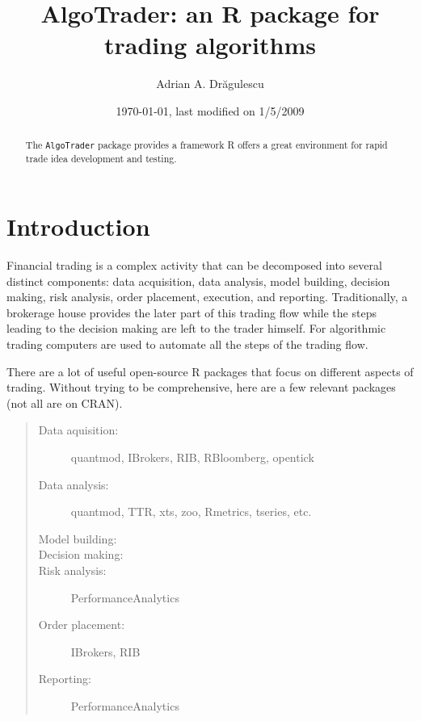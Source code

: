 \documentclass[nofootinbib]{revtex4}
\newcommand{\R}{{\normalfont\textsf{R }}{}}
\newcommand{\code}[1]{{\texttt{#1}}}
\begin{document}
\title{AlgoTrader: an R package for trading algorithms}
\author{Adrian A. Dr\u{a}gulescu}
\date{\today, last modified on 1/5/2009}

\begin{abstract}
The \code{AlgoTrader} package provides a framework \R
offers a great environment for rapid trade
idea development and testing. 
\end{abstract}

\maketitle
\tableofcontents


\section{Introduction}

Financial trading is a complex activity that can be decomposed into
several distinct components: data acquisition, data analysis, model
building, decision making, risk analysis, order placement, execution,
and reporting.  Traditionally, a brokerage house provides the later
part of this trading flow while the steps leading to the decision
making are left to the trader himself.  For algorithmic trading 
computers are used to automate all the steps of the trading flow.

There are a lot of useful open-source \R packages that focus on
different aspects of trading.  Without trying to be comprehensive,
here are a few relevant packages (not all are on CRAN).
\begin{quote}
\begin{description}
\item[Data aquisition:]quantmod, IBrokers, RIB, RBloomberg, opentick
\item[Data analysis:]quantmod, TTR, xts, zoo, Rmetrics, tseries, etc. 
\item[Model building:] 
\item[Decision making:]
\item[Risk analysis:] PerformanceAnalytics
\item[Order placement:] IBrokers, RIB
\item[Reporting:] PerformanceAnalytics
\end{description}
\end{quote}
\end{document}
